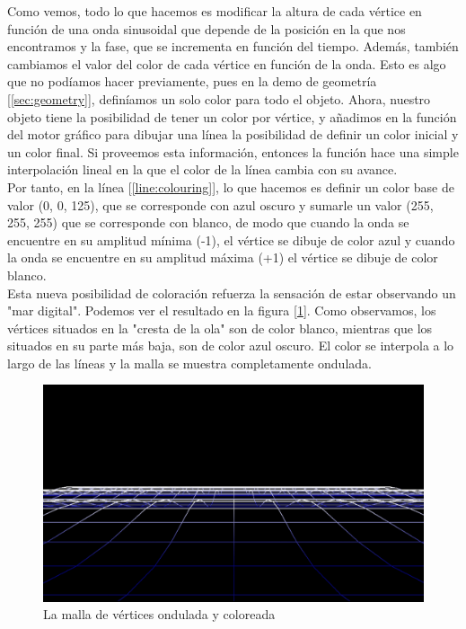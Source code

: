 Como vemos, todo lo que hacemos es modificar la altura de cada vértice en función de una onda sinusoidal que depende de la posición en la que nos encontramos y la fase, que se incrementa en función del tiempo. Además, también cambiamos el valor del color de cada vértice en función de la onda. Esto es algo que no podíamos hacer previamente, pues en la demo de geometría [\ref{sec:geometry}], definíamos un solo color para todo el objeto. Ahora, nuestro objeto tiene la posibilidad de tener un color por vértice, y añadimos en la función del motor gráfico para dibujar una línea la posibilidad de definir un color inicial y un color final. Si proveemos esta información, entonces la función hace una simple interpolación lineal en la que el color de la línea cambia con su avance.\\

Por tanto, en la línea [\ref{line:colouring}], lo que hacemos es definir un color base de valor (0, 0, 125), que se corresponde con azul oscuro y sumarle un valor (255, 255, 255) que se corresponde con blanco, de modo que cuando la onda se encuentre en su amplitud mínima (-1), el vértice se dibuje de color azul y cuando la onda se encuentre en su amplitud máxima (+1) el vértice se dibuje de color blanco.\\

Esta nueva posibilidad de coloración refuerza la sensación de estar observando un "mar digital". Podemos ver el resultado en la figura [\ref{fig:digitalsea}]. Como observamos, los vértices situados en la "cresta de la ola" son de color blanco, mientras que los situados en su parte más baja, son de color azul oscuro. El color se interpola a lo largo de las líneas y la malla se muestra completamente ondulada.\\

\begin{figure}[h]
	\centering
	\includegraphics[width=12cm]{archivos/digitalsea}
	\caption{La malla de vértices ondulada y coloreada}
	\label{fig:digitalsea}
\end{figure}

